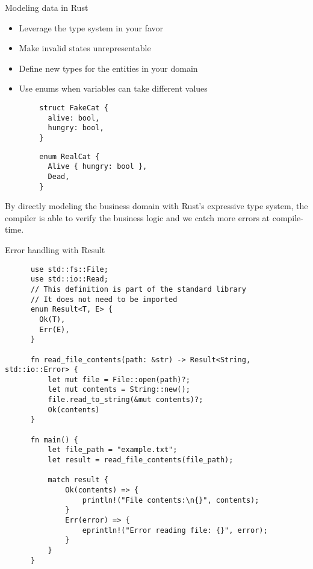 \documentclass{beamer}
\begin{document}
\begin{frame}[fragile]{Modeling data in Rust}
  \begin{itemize}
    \item Leverage the type system in your favor
    \item Make invalid states unrepresentable
    \item Define new types for the entities in your domain
    \item Use enums when variables can take different values
  \end{itemize}

  \begin{multicols}{2}
    \begin{listing}
      \begin{verbatim}
        struct FakeCat {
          alive: bool,
          hungry: bool,
        }
      \end{verbatim}
    \end{listing}

    \begin{listing}
      \begin{verbatim}
        enum RealCat {
          Alive { hungry: bool },
          Dead,
        }
      \end{verbatim}
    \end{listing}
  \end{multicols}
  
  By directly modeling the business domain with Rust's expressive type system,
  the compiler is able to verify the business logic and
  we catch more errors at compile-time.
\end{frame}

\begin{frame}[fragile]{Error handling with Result}
  \begin{listing}
    \begin{verbatim}
      use std::fs::File;
      use std::io::Read;
      // This definition is part of the standard library
      // It does not need to be imported
      enum Result<T, E> {
        Ok(T),
        Err(E),
      }  
      
      fn read_file_contents(path: &str) -> Result<String, std::io::Error> {
          let mut file = File::open(path)?;
          let mut contents = String::new();
          file.read_to_string(&mut contents)?;
          Ok(contents)
      }
      
      fn main() {
          let file_path = "example.txt";
          let result = read_file_contents(file_path);
      
          match result {
              Ok(contents) => {
                  println!("File contents:\n{}", contents);
              }
              Err(error) => {
                  eprintln!("Error reading file: {}", error);
              }
          }
      }      
    \end{verbatim}
  \end{listing}
\end{frame}
\end{document}
